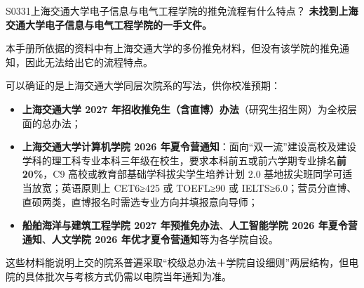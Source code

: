 \begin{qa}{S0331}{上海交通大学电子信息与电气工程学院的推免流程有什么特点？}
\textbf{未找到上海交通大学电子信息与电气工程学院的一手文件。}

本手册所依据的资料中有上海交通大学的多份推免材料，但没有该学院的推免通知，因此无法给出它的流程特点。

可以确证的是上海交通大学同层次院系的写法，供你校准预期：

\begin{itemize}
  \item \textbf{上海交通大学 2027 年招收推免生（含直博）办法}（研究生招生网）为全校层面的总办法；
  \item \textbf{上海交通大学计算机学院 2026 年夏令营通知}：面向“双一流”建设高校及建设学科的理工科专业本科三年级在校生，要求本科前五或前六学期专业排名\textbf{前 20\%}，C9 高校或教育部基础学科拔尖学生培养计划 2.0 基地拔尖班同学可适当放宽；英语原则上 CET6≥425 或 TOEFL≥90 或 IELTS≥6.0；营员分直博、直硕两类，直博报名时需选专业方向并填报意向导师；
  \item \textbf{船舶海洋与建筑工程学院 2027 年预推免办法}、\textbf{人工智能学院 2026 年夏令营通知}、\textbf{人文学院 2026 年优才夏令营通知}等为各学院自设。
\end{itemize}

这些材料能说明上交的院系普遍采取“校级总办法＋学院自设细则”两层结构，但电院的具体批次与考核方式仍需以电院当年通知为准。
\end{qa}

